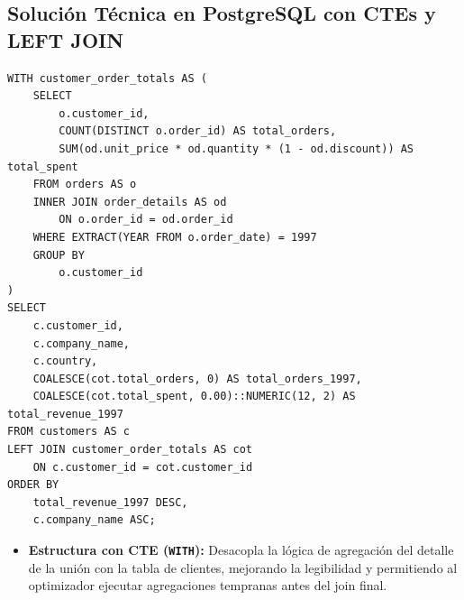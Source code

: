 \subsection{Soluci\'on T\'ecnica en PostgreSQL con CTEs y LEFT JOIN}

\begin{lstlisting}[style=sqlstyle, caption={Consulta modular con CTE y agregaci\'on sobre Northwind}]
WITH customer_order_totals AS (
    SELECT
        o.customer_id,
        COUNT(DISTINCT o.order_id) AS total_orders,
        SUM(od.unit_price * od.quantity * (1 - od.discount)) AS total_spent
    FROM orders AS o
    INNER JOIN order_details AS od
        ON o.order_id = od.order_id
    WHERE EXTRACT(YEAR FROM o.order_date) = 1997
    GROUP BY
        o.customer_id
)
SELECT
    c.customer_id,
    c.company_name,
    c.country,
    COALESCE(cot.total_orders, 0) AS total_orders_1997,
    COALESCE(cot.total_spent, 0.00)::NUMERIC(12, 2) AS total_revenue_1997
FROM customers AS c
LEFT JOIN customer_order_totals AS cot
    ON c.customer_id = cot.customer_id
ORDER BY
    total_revenue_1997 DESC,
    c.company_name ASC;
\end{lstlisting}

\begin{engtip}
\begin{itemize}
    \item \textbf{Estructura con CTE (\texttt{WITH}):} Desacopla la l\'ogica de agregaci\'on del detalle de la uni\'on con la tabla de clientes, mejorando la legibilidad y permitiendo al optimizador ejecutar agregaciones tempranas antes del join final.
\end{itemize}
\end{engtip}
